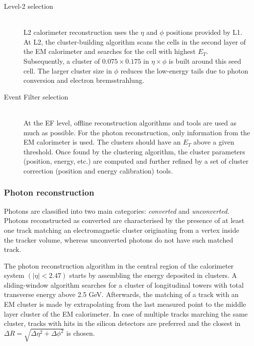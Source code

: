\documentclass[12pt, twoside]{article}
\numberwithin{equation}{section}
\numberwithin{figure}{section}
\begin{document}
\begin{description}
    \item[Level-2 selection]    \hfil \\
    L2 calorimeter reconstruction uses the $\eta$ and $\phi$ positions provided by L1. At L2, the cluster-building algorithm scans the cells in the second layer of the EM calorimeter and searches for the cell with highest $E_{T}$. Subsequently, a cluster of $0.075 \times 0.175$ in $\eta \times \phi$ is built around this seed cell. The larger cluster size in $\phi$ reduces the low-energy tails due to photon conversion and electron bremsstrahlung.

    \newpage
    \item[Event Filter selection]    \hfil \\
    At the EF level, offline reconstruction algorithms and tools are used as much as possible. For the photon reconstruction, only information from the EM calorimeter is used. The clusters should have an $E_{T}$ above a given threshold. Once found by the clustering algorithm, the cluster parameters (position, energy, etc.) are computed and further refined by a set of cluster correction (position and energy calibration) tools.
\end{description}

\subsubsection{Photon reconstruction}
\label{subsubsec:PhotonReconstruction}

Photons are classified into two main categories: \textit{converted} and \textit{unconverted}. Photons reconstructed as converted are characterised by the presence of at least one track matching an electromagnetic cluster originating from a vertex inside the tracker volume, whereas unconverted photons do not have such matched track.

The photon reconstruction algorithm in the central region of the calorimeter system $\left( \left| \eta \right| < 2.47 \right)$ starts by assembling the energy deposited in clusters. A sliding-window algorithm searches for a cluster of longitudinal towers with total transverse energy above 2.5 GeV. Afterwards, the matching of a track with an EM cluster is made by extrapolating from the last measured point to the middle layer cluster of the EM calorimeter. In case of multiple tracks marching the same cluster, tracks with hits in the silicon detectors are preferred and the closest in $\Delta R = \sqrt{\Delta \eta^{2} + \Delta \phi^{2}}$ is chosen.
\end{document}
